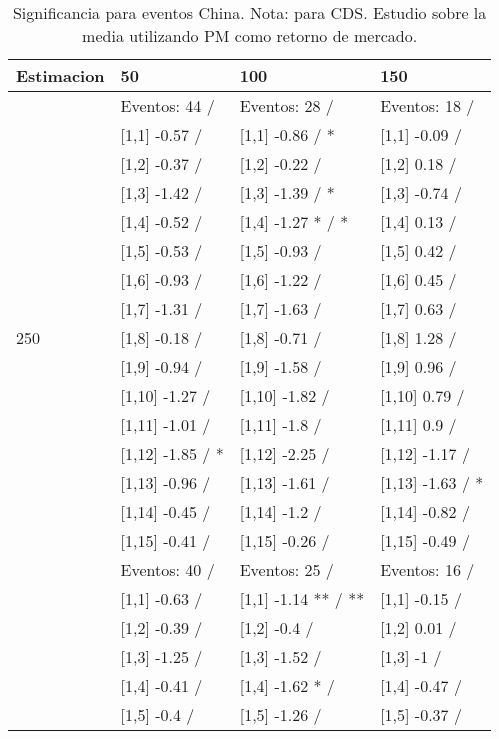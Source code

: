 \begin{table}

\caption{Significancia para eventos China. Nota: para CDS. Estudio sobre la media utilizando PM como retorno de mercado.}
\centering
\begin{tabular}[t]{llll}
\toprule
Estimacion & 50 & 100 & 150\\
\midrule
 & Eventos:  44 / & Eventos:  28 / & Eventos:  18 /\\
 & {}[1,1] -0.57  / & {}[1,1] -0.86  / * & {}[1,1] -0.09  /\\
 & {}[1,2] -0.37  / & {}[1,2] -0.22  / & {}[1,2] 0.18  /\\
 & {}[1,3] -1.42  / & {}[1,3] -1.39  / * & {}[1,3] -0.74  /\\
 & {}[1,4] -0.52  / & {}[1,4] -1.27 * / * & {}[1,4] 0.13  /\\
\addlinespace
 & {}[1,5] -0.53  / & {}[1,5] -0.93  / & {}[1,5] 0.42  /\\
 & {}[1,6] -0.93  / & {}[1,6] -1.22  / & {}[1,6] 0.45  /\\
 & {}[1,7] -1.31  / & {}[1,7] -1.63  / & {}[1,7] 0.63  /\\
250 & {}[1,8] -0.18  / & {}[1,8] -0.71  / & {}[1,8] 1.28  /\\
 & {}[1,9] -0.94  / & {}[1,9] -1.58  / & {}[1,9] 0.96  /\\
\addlinespace
 & {}[1,10] -1.27  / & {}[1,10] -1.82  / & {}[1,10] 0.79  /\\
 & {}[1,11] -1.01  / & {}[1,11] -1.8  / & {}[1,11] 0.9  /\\
 & {}[1,12] -1.85  / * & {}[1,12] -2.25  / & {}[1,12] -1.17  /\\
 & {}[1,13] -0.96  / & {}[1,13] -1.61  / & {}[1,13] -1.63  / *\\
 & {}[1,14] -0.45  / & {}[1,14] -1.2  / & {}[1,14] -0.82  /\\
\addlinespace
 & {}[1,15] -0.41  / & {}[1,15] -0.26  / & {}[1,15] -0.49  /\\
 & Eventos:  40 / & Eventos:  25 / & Eventos:  16 /\\
 & {}[1,1] -0.63  / & {}[1,1] -1.14 ** / ** & {}[1,1] -0.15  /\\
 & {}[1,2] -0.39  / & {}[1,2] -0.4  / & {}[1,2] 0.01  /\\
 & {}[1,3] -1.25  / & {}[1,3] -1.52  / & {}[1,3] -1  /\\
\addlinespace
 & {}[1,4] -0.41  / & {}[1,4] -1.62 * / & {}[1,4] -0.47  /\\
 & {}[1,5] -0.4  / & {}[1,5] -1.26  / & {}[1,5] -0.37  /\\

\end{tabular}
\end{table}
